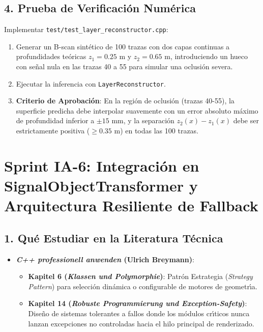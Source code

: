 \documentclass[11pt,a4paper]{article}
\begin{document}
\subsection{4. Prueba de Verificaci{\'o}n Num{\'e}rica}
Implementar \texttt{test/test\_layer\_reconstructor.cpp}:
\begin{enumerate}
    \item Generar un B-scan sint{\'e}tico de 100 trazas con dos capas continuas a profundidades te{\'o}ricas $z_1 = 0.25\text{ m}$ y $z_2 = 0.65\text{ m}$, introduciendo un hueco con se{\~n}al nula en las trazas 40 a 55 para simular una oclusi{\'o}n severa.
    \item Ejecutar la inferencia con \texttt{LayerReconstructor}.
    \item \textbf{Criterio de Aprobaci{\'o}n}: En la regi{\'o}n de oclusi{\'o}n (trazas 40-55), la superficie predicha debe interpolar suavemente con un error absoluto m{\'a}ximo de profundidad inferior a $\pm 15\text{ mm}$, y la separaci{\'o}n $z_2(x) - z_1(x)$ debe ser estrictamente positiva ($\ge 0.35\text{ m}$) en todas las 100 trazas.
\end{enumerate}

\newpage

\section{Sprint IA-6: Integraci{\'o}n en SignalObjectTransformer y Arquitectura Resiliente de Fallback}

\subsection{1. Qu{\'e} Estudiar en la Literatura T{\'e}cnica}
\begin{itemize}
    \item \textbf{\textit{C++ professionell anwenden} (Ulrich Breymann)}:
    \begin{itemize}
        \item \textbf{Kapitel 6 (\textit{Klassen und Polymorphie})}: Patr{\'o}n Estrategia (\textit{Strategy Pattern}) para selecci{\'o}n din{\'a}mica o configurable de motores de geometr{\'\i}a.
        \item \textbf{Kapitel 14 (\textit{Robuste Programmierung und Exception-Safety})}: Dise{\~n}o de sistemas tolerantes a fallos donde los m{\'o}dulos cr{\'\i}ticos nunca lanzan excepciones no controladas hacia el hilo principal de renderizado.
    \end{itemize}
\end{itemize}
\end{document}

